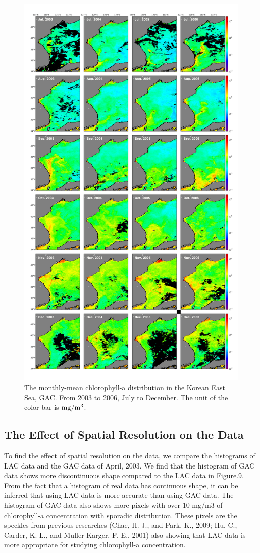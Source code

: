 \begin{figure}
	\centering
	\includegraphics[width=0.8\linewidth]{../images/noname04}
	\caption{The monthly-mean chlorophyll-a distribution in the Korean East Sea, GAC. From 2003 to 2006, July to December. The unit of the color bar is $\rm mg/m^3$.}
	\label{fig:noname04}
\end{figure}
 
\subsection{The Effect of Spatial Resolution on the Data}
 
To find the effect of spatial resolution on the data, we compare the histograms of LAC data and the GAC data of April, 2003. We find that the histogram of GAC data shows more discontinuous shape compared to the LAC data in Figure.9. From the fact that a histogram of real data has continuous shape, it can be inferred that using LAC data is more accurate than using GAC data. The histogram of GAC data also shows more pixels with over 10 mg/m3 of chlorophyll-a concentration with sporadic distribution. These pixels are the speckles from previous researches (Chae, H. J., and Park, K., 2009; Hu, C., Carder, K. L., and Muller-Karger, F. E., 2001) also showing that LAC data is more appropriate for studying chlorophyll-a concentration.
  
